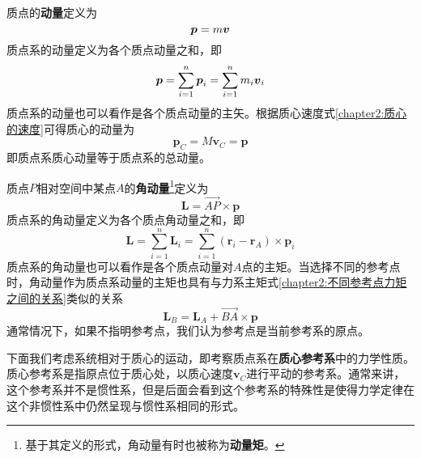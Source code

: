 质点的{\bf 动量}定义为
\begin{equation}
	\boldsymbol{p} = m\boldsymbol{v}
\end{equation}
质点系的动量定义为各个质点动量之和，即
\begin{equation}
	\boldsymbol{p} = \sum_{i=1}^n \boldsymbol{p}_i = \sum_{i=1}^nm_i\boldsymbol{v}_i
\end{equation}
质点系的动量也可以看作是各个质点动量的主矢。根据质心速度式\eqref{chapter2:质心的速度}可得质心的动量为
\begin{equation}
	\boldsymbol{p}_C = M\boldsymbol{v}_C = \boldsymbol{p}
	\label{chapter2:质心动量表达式}
\end{equation}
即质点系质心动量等于质点系的总动量。

质点$P$相对空间中某点$A$的{\bf 角动量}\footnote{基于其定义的形式，角动量有时也被称为{\bf 动量矩}。}定义为
\begin{equation}
	\boldsymbol{L} = \vec{AP} \times \boldsymbol{p}
\end{equation}
质点系的角动量定义为各个质点角动量之和，即
\begin{equation}
	\boldsymbol{L} = \sum_{i=1}^n \boldsymbol{L}_i = \sum_{i=1}^n (\boldsymbol{r}_i - \boldsymbol{r}_A) \times\boldsymbol{p}_i
	\label{chapter2:系统角动量的定义式}
\end{equation}
质点系的角动量也可以看作是各个质点动量对$A$点的主矩。当选择不同的参考点时，角动量作为质点系动量的主矩也具有与力系主矩式\eqref{chapter2:不同参考点力矩之间的关系}类似的关系
\begin{equation}
	\boldsymbol{L}_B = \boldsymbol{L}_A + \vec{BA} \times \boldsymbol{p}
\end{equation}
通常情况下，如果不指明参考点，我们认为参考点是当前参考系的原点。

下面我们考虑系统相对于质心的运动，即考察质点系在{\bf 质心参考系}中的力学性质。质心参考系是指原点位于质心处，以质心速度$\boldsymbol{v}_C$进行平动的参考系。通常来讲，这个参考系并不是惯性系，但是后面会看到这个参考系的特殊性是使得力学定律在这个非惯性系中仍然呈现与惯性系相同的形式。

